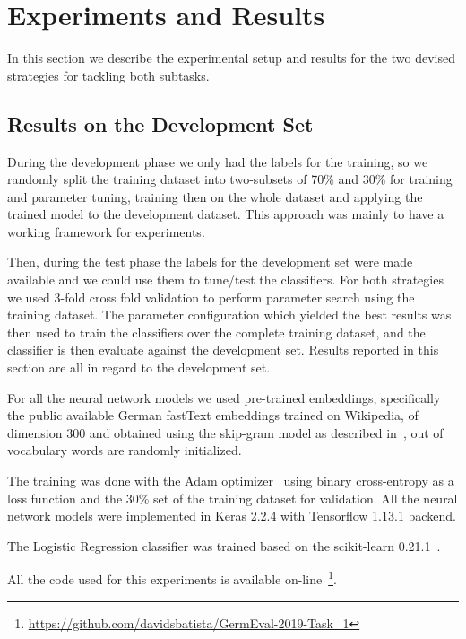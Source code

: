 \documentclass[11pt,a4paper]{article}
\begin{document}
\section{Experiments and Results}\label{experiments}

In this section we describe the experimental setup and results for the two
devised strategies for tackling both subtasks.

\subsection{Results on the Development Set}

During the development phase we only had the labels for the training, so we
randomly split the training dataset into two-subsets of 70\% and 30\% for
training and parameter tuning, training then on the whole dataset and applying
the trained model to the development dataset. This approach was mainly to have
a working framework for experiments.

Then, during the test phase the labels for the development set were made available
and we could use them to tune/test the classifiers. For both strategies we used
3-fold cross fold validation to perform parameter
search using the training dataset. The parameter configuration which yielded
the best results was then used to train the classifiers over the complete training
dataset, and the classifier is then evaluate against the development set. Results
reported in this section are all in regard to the development set.

For all the neural network models we used pre-trained embeddings, specifically
the public available German fastText embeddings trained on Wikipedia, of
dimension 300 and obtained using the skip-gram model as described
in~\citet{bojanowski-etal-2017-enriching}, out of vocabulary words are randomly
initialized.

The training was done with the Adam optimizer~\cite{journals/corr/KingmaB14}
using binary cross-entropy as a loss function and the 30\% set of the training
dataset  for validation. All the neural network models were implemented in
Keras 2.2.4 with Tensorflow 1.13.1 backend.

The Logistic Regression classifier was trained based on the scikit-learn
0.21.1~\cite{Pedregosa:2011:SML:1953048.2078195}.

All the code used for this experiments is available
on-line~\footnote{\url{https://github.com/davidsbatista/GermEval-2019-Task_1}}.
\end{document}
